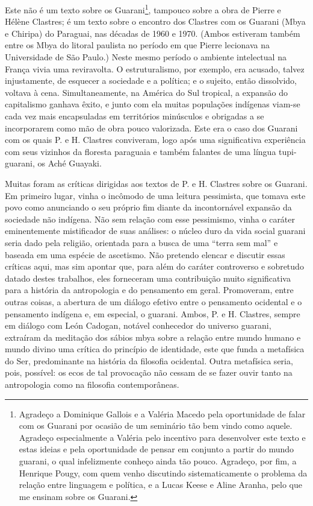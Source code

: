 {{Este não é um texto sobre os Guarani\footnote{Agradeço a Dominique
Gallois e a Valéria Macedo pela oportunidade de falar com os Guarani
por ocasião de um seminário tão bem vindo como aquele. Agradeço
especialmente a Valéria pelo incentivo para desenvolver este texto e
estas ideias e pela oportunidade de pensar em conjunto a partir do
mundo guarani, o qual infelizmente conheço ainda tão pouco. Agradeço,
por fim, a Henrique Pougy, com quem venho discutindo sistematicamente o
problema da relação entre linguagem e política, e a Lucas Keese e Aline
Aranha, pelo que me ensinam sobre os Guarani.}, tampouco sobre a obra
de Pierre e Hélène Clastres; é um texto sobre o encontro dos Clastres
com os Guarani (Mbya e Chiripa) do Paraguai, nas décadas de 1960 e
1970. (Ambos estiveram também entre os Mbya do litoral paulista no
período em que Pierre lecionava na Universidade de São Paulo.) Neste
mesmo período o ambiente intelectual na França vivia uma reviravolta. O
estruturalismo, por exemplo, era acusado, talvez injustamente, de
esquecer a sociedade e a política; e o sujeito, então dissolvido,
voltava à cena. Simultaneamente, na América do Sul tropical, a expansão
do capitalismo ganhava êxito, e junto com ela muitas populações
indígenas viam-se cada vez mais encapsuladas em territórios minúsculos
e obrigadas a se incorporarem como mão de obra pouco valorizada. Este
era o caso dos Guarani com os quais P. e H. Clastres conviveram, logo
após uma significativa experiência com seus vizinhos da floresta
paraguaia e também falantes de uma língua tupi-guarani, os Aché
Guayaki.

Muitas foram as críticas dirigidas aos textos de P. e H. Clastres sobre
os Guarani. Em primeiro lugar, vinha o incômodo de uma leitura
pessimista, que tomava este povo como anunciando o seu próprio fim
diante da incontornável expansão da sociedade não indígena. Não sem
relação com esse pessimismo, vinha o caráter eminentemente mistificador
de suas análises: o núcleo duro da vida social guarani seria dado pela
religião, orientada para a busca de uma ``terra sem mal'' e baseada em
uma espécie de ascetismo. Não pretendo elencar e discutir essas
críticas aqui, mas sim apontar que, para além do caráter controverso e
sobretudo datado destes trabalhos, eles forneceram uma contribuição
muito significativa para a história da antropologia e do pensamento em
geral. Promoveram, entre outras coisas, a abertura de um diálogo
efetivo entre o pensamento ocidental e o pensamento indígena e, em
especial, o guarani. Ambos, P. e H. Clastres, sempre em diálogo com
León Cadogan, notável conhecedor do universo guarani, extraíram da
meditação dos sábios mbya sobre a relação entre mundo humano e mundo
divino uma crítica do princípio de identidade, este que funda a
metafísica do Ser, predominante na história da filosofia ocidental.
Outra metafísica seria, pois, possível: os ecos de tal provocação não
cessam de se fazer ouvir tanto na antropologia como na filosofia
contemporâneas.

}}
